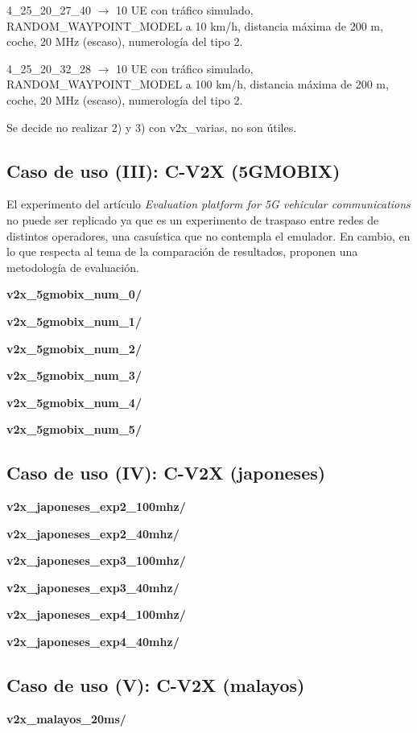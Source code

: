 \documentclass[12pt]{report} %
\begin{document}
4\_25\_20\_27\_40 $\rightarrow$ 10 UE con tráfico simulado, RANDOM\_WAYPOINT\_MODEL a 10 km/h, distancia máxima de 200 m, coche, 20 MHz (escaso), numerología del tipo 2.

4\_25\_20\_32\_28 $\rightarrow$ 10 UE con tráfico simulado, RANDOM\_WAYPOINT\_MODEL a 100 km/h, distancia máxima de 200 m, coche, 20 MHz (escaso), numerología del tipo 2.

Se decide no realizar 2) y 3) con v2x\_varias, no son útiles.

\subsection* {Caso de uso (III): C-V2X (5GMOBIX)}

El experimento del artículo \textit{Evaluation platform for 5G vehicular communications} no puede ser replicado ya que es un experimento de traspaso entre redes de distintos operadores, una casuística que no contempla el emulador. En cambio, en lo que respecta al tema de la comparación de resultados, proponen una metodología de evaluación.

\textbf{v2x\_5gmobix\_num\_0/}

\textbf{v2x\_5gmobix\_num\_1/}

\textbf{v2x\_5gmobix\_num\_2/}

\textbf{v2x\_5gmobix\_num\_3/}

\textbf{v2x\_5gmobix\_num\_4/}

\textbf{v2x\_5gmobix\_num\_5/}


\subsection* {Caso de uso (IV): C-V2X (japoneses)}

\textbf{v2x\_japoneses\_exp2\_100mhz/}

\textbf{v2x\_japoneses\_exp2\_40mhz/}

\textbf{v2x\_japoneses\_exp3\_100mhz/}

\textbf{v2x\_japoneses\_exp3\_40mhz/}

\textbf{v2x\_japoneses\_exp4\_100mhz/}

\textbf{v2x\_japoneses\_exp4\_40mhz/}

\subsection* {Caso de uso (V): C-V2X (malayos)}

\textbf{v2x\_malayos\_20ms/}
\end{document}
